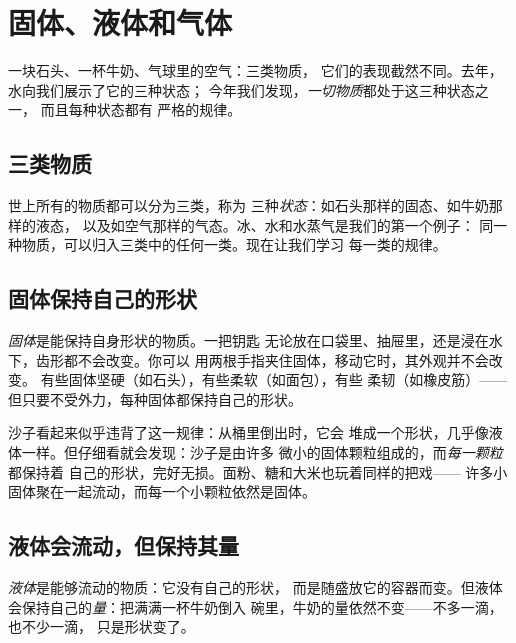 \chapter{固体、液体和气体}\label{ch:g3:solids-liquids-gases}

一块石头、一杯牛奶、气球里的空气：三类物质，
它们的表现截然不同。去年，水向我们展示了它的三种状态；
今年我们发现，\emph{一切物质}都处于这三种状态之一，
而且每种状态都有
严格的规律。

\section{三类物质}

世上所有的物质都可以分为三类，称为
三种\emph{状态}：如石头那样的固态、如牛奶那样的液态，
以及如空气那样的气态。冰、水和水蒸气是我们的第一个例子：
同一种物质，可以归入三类中的任何一类。现在让我们学习
每一类的规律。

\section{固体保持自己的形状}

\begin{definition}[固体]\label{def:g3:solids-liquids-gases:solid}
\emph{固体}是能保持自身形状的物质。一把钥匙
无论放在口袋里、抽屉里，还是浸在水下，齿形都不会改变。你可以
用两根手指夹住固体，移动它时，其外观并不会改变。
有些固体坚硬（如石头），有些柔软（如面包），有些
柔韧（如橡皮筋）——但只要不受外力，每种固体都保持自己的形状。
\end{definition}

\begin{example}[由颗粒组成的固体]\label{ex:g3:solids-liquids-gases:sand}
沙子看起来似乎违背了这一规律：从桶里倒出时，它会
堆成一个形状，几乎像液体一样。但仔细看就会发现：沙子是由许多
微小的固体颗粒组成的，而\emph{每一颗粒}都保持着
自己的形状，完好无损。面粉、糖和大米也玩着同样的把戏——
许多小固体聚在一起流动，而每一个小颗粒依然是固体。
\end{example}

\section{液体会流动，但保持其量}

\begin{definition}[液体]\label{def:g3:solids-liquids-gases:liquid}
\emph{液体}是能够流动的物质：它没有自己的形状，
而是随盛放它的容器而变。但液体
会保持自己的\emph{量}：把满满一杯牛奶倒入
碗里，牛奶的量依然不变——不多一滴，也不少一滴，
只是形状变了。
\end{definition}

